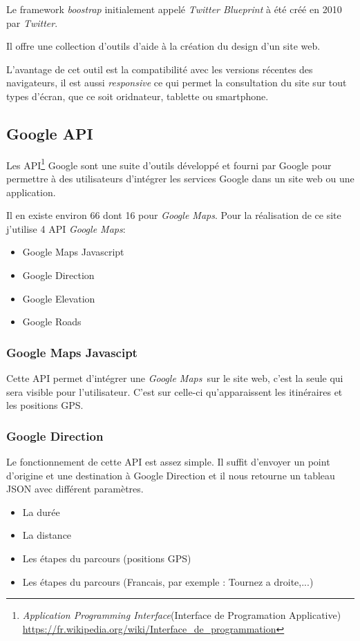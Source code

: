 \documentclass[a4paper]{article}
\newcommand{\gmap}{\emph{Google Maps}}
\newcommand{\bt}{\emph{boostrap }}
\begin{document}
Le framework \bt initialement appelé \emph{Twitter Blueprint} à été créé en 2010 par \emph{Twitter}.

Il offre une collection d'outils d'aide à la création du design d'un site web.

L'avantage de cet outil est la compatibilité avec les versions récentes des navigateurs, il est aussi \emph{responsive} ce qui permet la consultation du site sur tout types d'écran, que ce soit oridnateur, tablette ou smartphone.



\subsection{Google API}
Les API\footnote{\emph{Application Programming Interface}(Interface de Programation Applicative) \url{https://fr.wikipedia.org/wiki/Interface_de_programmation}} Google sont une suite d'outils développé et fourni par Google pour permettre à des utilisateurs d'intégrer les services Google dans un site web ou une application.

Il en existe environ 66 dont 16 pour \gmap. Pour la réalisation de ce site j'utilise 4 API \gmap : 
\begin{itemize}
    \item Google Maps Javascript
    \item Google Direction
    \item Google Elevation
    \item Google Roads
\end{itemize}

\subsubsection{Google Maps Javascipt}
Cette API permet d'intégrer une \gmap \ sur le site web, c'est la seule qui sera visible pour l'utilisateur. C'est sur celle-ci qu'apparaissent les itinéraires et les positions GPS.
\subsubsection{Google Direction}
Le fonctionnement de cette API est assez simple. Il suffit d'envoyer un point d'origine et une destination à Google Direction et il nous retourne un tableau JSON avec différent paramètres.
\begin{itemize}
    \item La durée
    \item La distance
    \item Les étapes du parcours (positions GPS)
    \item Les étapes du parcours (Francais, par exemple : Tournez a droite,...)
\end{itemize}
\end{document}

